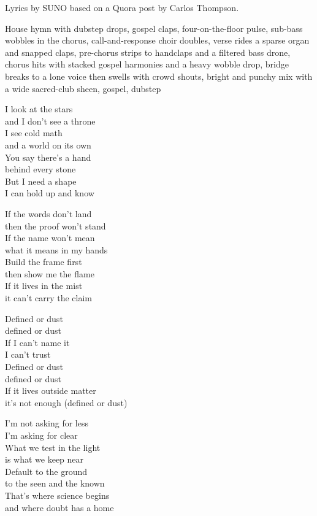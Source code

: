 
\begin{notes}
Lyrics by SUNO based on a Quora post by Carlos Thompson.
\end{notes}
\begin{style}
House hymn with dubstep drops, gospel claps, four-on-the-floor pulse, sub-bass wobbles in the chorus, call-and-response choir doubles, verse rides a sparse organ and snapped claps, pre-chorus strips to handclaps and a filtered bass drone, chorus hits with stacked gospel harmonies and a heavy wobble drop, bridge breaks to a lone voice then swells with crowd shouts, bright and punchy mix with a wide sacred-club sheen, gospel, dubstep
\end{style}
\begin{lyrics}
I look at the stars\\
and I don’t see a throne\\
I see cold math\\
and a world on its own\\
You say there’s a hand\\
behind every stone\\
But I need a shape\\
I can hold up and know

If the words don’t land\\
then the proof won’t stand\\
If the name won’t mean\\
what it means in my hands\\
Build the frame first\\
then show me the flame\\
If it lives in the mist\\
it can’t carry the claim

Defined or dust\\
defined or dust\\
If I can’t name it\\
I can’t trust\\
Defined or dust\\
defined or dust\\
If it lives outside matter\\
it’s not enough
(defined or dust)

I’m not asking for less\\
I’m asking for clear\\
What we test in the light\\
is what we keep near\\
Default to the ground\\
to the seen and the known\\
That’s where science begins\\
and where doubt has a home


\end{lyrics}
